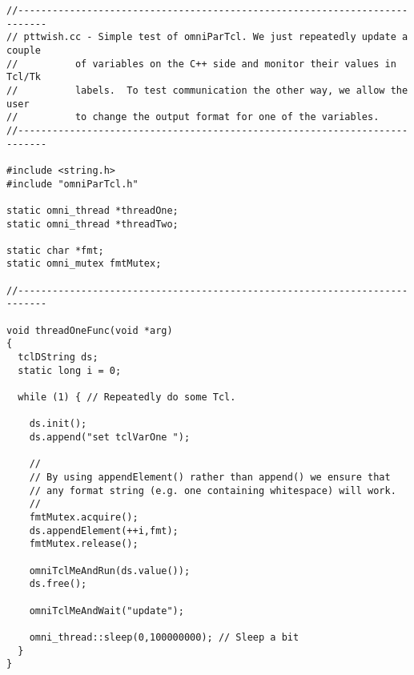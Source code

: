 \documentclass[11pt,twoside,onecolumn]{article}
\begin{document}
\newpage
{\small
\begin{verbatim}
//---------------------------------------------------------------------------
// pttwish.cc - Simple test of omniParTcl. We just repeatedly update a couple
//          of variables on the C++ side and monitor their values in Tcl/Tk 
//          labels.  To test communication the other way, we allow the user 
//          to change the output format for one of the variables.
//---------------------------------------------------------------------------

#include <string.h>
#include "omniParTcl.h"

static omni_thread *threadOne;
static omni_thread *threadTwo;

static char *fmt;
static omni_mutex fmtMutex;

//---------------------------------------------------------------------------

void threadOneFunc(void *arg)
{
  tclDString ds;
  static long i = 0;
  
  while (1) { // Repeatedly do some Tcl.
      
    ds.init();
    ds.append("set tclVarOne ");

    //
    // By using appendElement() rather than append() we ensure that
    // any format string (e.g. one containing whitespace) will work.
    //
    fmtMutex.acquire();
    ds.appendElement(++i,fmt);      
    fmtMutex.release();    
    
    omniTclMeAndRun(ds.value());
    ds.free();
      
    omniTclMeAndWait("update");
    
    omni_thread::sleep(0,100000000); // Sleep a bit
  }
}
\end{verbatim}
}
\newpage
\end{document}
